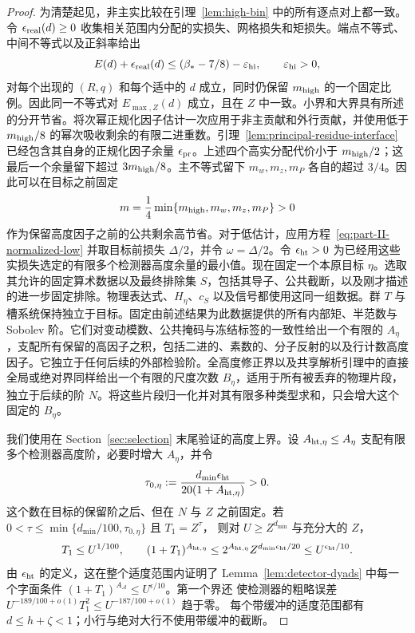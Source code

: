 \documentclass[11pt,a4paper]{article}
\numberwithin{equation}{section}
\numberwithin{figure}{section}
\theoremstyle{definition}
\theoremstyle{remark}
\begin{document}
\begin{proof}
为清楚起见，非主实比较在引理~\ref{lem:high-bin} 中的所有逐点对上都一致。令 \(\epsilon_{\rm real}(d)\ge0\) 收集相关范围内分配的实损失、网格损失和矩损失。端点不等式、中间不等式以及正斜率给出
\begin{equation}\label{eq:saving-criterion}
 E(d)+\epsilon_{\rm real}(d)
 \le(\beta_*-7/8)-\varepsilon_{\rm hi},
 \qquad \varepsilon_{\rm hi}>0,
\end{equation}
对每个出现的 \((R,q)\) 和每个适中的 \(d\) 成立，同时仍保留 \(m_{\rm high}\) 的一个固定比例。因此同一不等式对 \(E_{\max,Z}(d)\) 成立，且在 \(Z\) 中一致。小界和大界具有所述的分开节省。将次幂正规化因子估计一次应用于非主贡献和外行贡献，并使用低于 \(m_{\rm high}/8\) 的幂次吸收剩余的有限二进重数。引理~\ref{lem:principal-residue-interface} 已经包含其自身的正规化因子余量 \(\epsilon_{\rm pr}\)。上述四个高实分配代价小于 \(m_{\rm high}/2\)；这最后一个余量留下超过 \(3m_{\rm high}/8\)。主不等式留下 \(m_w,m_z,m_P\) 各自的超过 \(3/4\)。因此可以在目标之前固定
\[
 m=\frac14\min\{m_{\rm high},m_w,m_z,m_P\}>0
\]
作为保留高度因子之前的公共剩余高节省。对于低估计，应用方程~\eqref{eq:part-II-normalized-low} 并取目标前损失 \(\Delta/2\)，并令 \(\omega=\Delta/2\)。令 \(\epsilon_{\rm ht}>0\) 为已经用这些实损失选定的有限多个检测器高度余量的最小值。现在固定一个本原目标 \(\eta\)。选取其允许的固定算术数据以及最终排除集 \(S\)，包括其导子、公共截断，以及刚才描述的进一步固定排除。物理表达式、\(H_\eta\)、\(c_S\) 以及信号都使用这同一组数据。群 \(T\) 与槽系统保持独立于目标。固定由前述结果为此数据提供的所有内部矩、半范数与 Sobolev 阶。它们对变动模数、公共掩码与冻结标签的一致性给出一个有限的 \(A_\eta\)，支配所有保留的高因子之积，包括二进的、素数的、分子反射的以及行计数高度因子。它独立于任何后续的外部检验阶。全高度修正界以及共享解析引理中的直接全局或绝对界同样给出一个有限的尺度次数 \(B_\eta\)，适用于所有被丢弃的物理片段，独立于后续的阶 \(N\)。将这些片段归一化并对其有限多种类型求和，只会增大这个固定的 \(B_\eta\)。

我们使用在 Section~\ref{sec:selection} 末尾验证的高度上界。设 \(A_{{\rm ht},\eta}\le A_\eta\) 支配有限多个检测器高度阶，必要时增大 \(A_\eta\)，并令
\[
 \tau_{0,\eta}:=
       \frac{d_{\min}\epsilon_{\rm ht}}{20(1+A_{{\rm ht},\eta})}>0.
\]
这个数在目标的保留阶之后、但在 \(N\) 与 \(Z\) 之前固定。若
\(0<\tau\le\min\{d_{\min}/100,\tau_{0,\eta}\}\) 且 \(T_1=Z^\tau\)，
则对 \(U\ge Z^{d_{\min}}\) 与充分大的 \(Z\)，
\[
 T_1\le U^{1/100},\qquad
 (1+T_1)^{A_{{\rm ht},\eta}}
 \le2^{A_{{\rm ht},\eta}}Z^{d_{\min}\epsilon_{\rm ht}/20}
 \le U^{\epsilon_{\rm ht}/10}.
\]
由 \(\epsilon_{\rm ht}\) 的定义，这在整个适度范围内证明了 Lemma~\ref{lem:detector-dyads} 中每一个字面条件 \((1+T_1)^{A_{\mathcal A}}\le U^{\epsilon/10}\)。第一个界还
使检测器的粗略误差
\(U^{-189/100+o(1)}T_1^2\le U^{-187/100+o(1)}\) 趋于零。
每个带缓冲的适度范围都有 \(d\le h+\zeta<1\)；小行与绝对大行不使用带缓冲的截断。


\end{proof}
\end{document}
